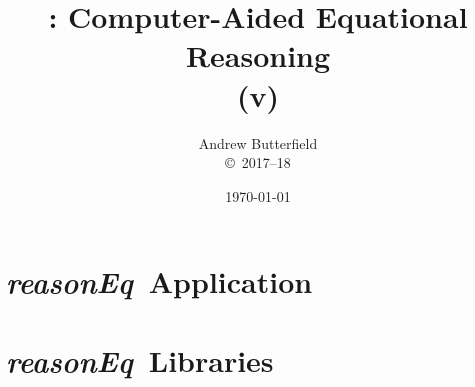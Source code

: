 \documentclass[fleqn,10pt]{report}
\author{
Andrew Butterfield
\\
{\small \copyright\ 2017--18}
}
\title{
  \reasonEq: Computer-Aided Equational Reasoning
  \\(v\reqVersion)
}
\date{
\today
}
\def\reasonEq{\textit{\textsf{reasonEq}}}
\begin{document}
\maketitle
\tableofcontents

\chapter{\reasonEq\ Application}
%


\chapter{\reasonEq\ Libraries}

% 
% 
% 
% 
% 
% 
% 
% 
% 
% 
% 
\newpage

\newpage

\newpage

\newpage

\newpage

% 
\newpage

% 
% 
% 
% 
% 
% 
% 
% 
% 
% 
% 
% 

%
% 
% 
%
%
% 
% 
% 
% 
%


%
%
%
% 
\end{document}
